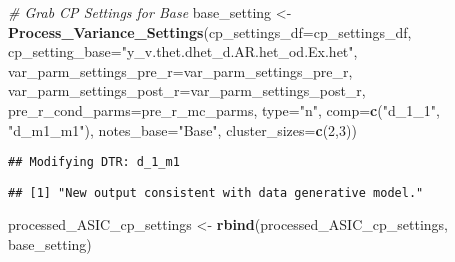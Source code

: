 \documentclass[
]{article}
\newenvironment{Shaded}{\begin{snugshade}}{\end{snugshade}}
\newcommand{\AttributeTok}[1]{\textcolor[rgb]{0.13,0.29,0.53}{#1}}
\newcommand{\CommentTok}[1]{\textcolor[rgb]{0.56,0.35,0.01}{\textit{#1}}}
\newcommand{\DecValTok}[1]{\textcolor[rgb]{0.00,0.00,0.81}{#1}}
\newcommand{\FunctionTok}[1]{\textcolor[rgb]{0.13,0.29,0.53}{\textbf{#1}}}
\newcommand{\NormalTok}[1]{#1}
\newcommand{\OtherTok}[1]{\textcolor[rgb]{0.56,0.35,0.01}{#1}}
\newcommand{\StringTok}[1]{\textcolor[rgb]{0.31,0.60,0.02}{#1}}
\begin{document}
\begin{Shaded}
\begin{Highlighting}[]
\CommentTok{\# Grab CP Settings for Base}
\NormalTok{base\_setting }\OtherTok{\textless{}{-}} 
  \FunctionTok{Process\_Variance\_Settings}\NormalTok{(}\AttributeTok{cp\_settings\_df=}\NormalTok{cp\_settings\_df, }
                            \AttributeTok{cp\_setting\_base=}\StringTok{"y\_v.thet.dhet\_d.AR.het\_od.Ex.het"}\NormalTok{, }
                            \AttributeTok{var\_parm\_settings\_pre\_r=}\NormalTok{var\_parm\_settings\_pre\_r, }
                            \AttributeTok{var\_parm\_settings\_post\_r=}\NormalTok{var\_parm\_settings\_post\_r,}
                            \AttributeTok{pre\_r\_cond\_parms=}\NormalTok{pre\_r\_mc\_parms,}
                            \AttributeTok{type=}\StringTok{"n"}\NormalTok{,}
                            \AttributeTok{comp=}\FunctionTok{c}\NormalTok{(}\StringTok{"d\_1\_1"}\NormalTok{, }\StringTok{"d\_m1\_m1"}\NormalTok{), }
                            \AttributeTok{notes\_base=}\StringTok{"Base"}\NormalTok{, }
                            \AttributeTok{cluster\_sizes=}\FunctionTok{c}\NormalTok{(}\DecValTok{2}\NormalTok{,}\DecValTok{3}\NormalTok{))}
\end{Highlighting}
\end{Shaded}

\begin{verbatim}
## Modifying DTR: d_1_m1
\end{verbatim}

\begin{verbatim}
## [1] "New output consistent with data generative model."
\end{verbatim}

\begin{Shaded}
\begin{Highlighting}[]
\NormalTok{processed\_ASIC\_cp\_settings }\OtherTok{\textless{}{-}} \FunctionTok{rbind}\NormalTok{(processed\_ASIC\_cp\_settings, base\_setting)}
\end{Highlighting}
\end{Shaded}
\end{document}
